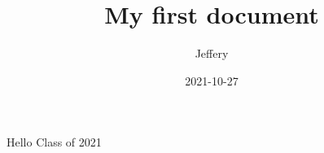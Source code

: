\documentclass{article}
\title{My first document}
\date{2021-10-27}
\author{Jeffery}
\begin{document}
	\maketitle
	\newpage
	Hello Class of 2021
\end{document}
